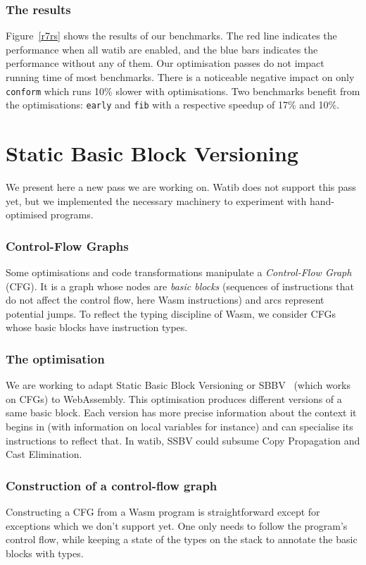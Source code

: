 \documentclass[a4paper,11pt]{article}
\begin{document}
\subsubsection{The results}
Figure~\ref{r7rs} shows the results of our benchmarks. The red line indicates
the performance when all \textsf{watib} are enabled, and the blue bars indicates
the performance without any of them. Our optimisation passes do not impact
running time of most benchmarks. There is a noticeable negative impact on only
\texttt{conform} which runs 10\% slower with optimisations. Two benchmarks
benefit from the optimisations: \texttt{early} and \texttt{fib} with a
respective speedup of 17\% and 10\%.

\section{Static Basic Block Versioning}\label{sbbv}
We present here a new pass we are working on. \textsf{Watib} does not support
this pass yet, but we implemented the necessary machinery to experiment with
hand-optimised programs.
\subsubsection{Control-Flow Graphs}\label{cfg}
Some optimisations and code transformations manipulate a \emph{Control-Flow
Graph} (CFG). It is a graph whose nodes are \emph{basic blocks} (sequences of
instructions that do not affect the control flow, here Wasm instructions) and
arcs represent potential jumps. To reflect the typing discipline of Wasm, we
consider CFGs whose basic blocks have instruction types.

\subsubsection{The optimisation}
We are working to adapt Static Basic Block Versioning or
SBBV~\cite{melanccon2024static} (which works on CFGs) to WebAssembly. This
optimisation produces different versions of a same basic block. Each version has
more precise information about the context it begins in (with information on
local variables for instance) and can specialise its instructions to reflect
that. In \textsf{watib}, SSBV could subsume Copy Propagation and Cast
Elimination.

\subsubsection{Construction of a control-flow graph}
Constructing a CFG from a Wasm program is straightforward except for exceptions
which we don't support yet. One only needs to follow the program's control flow,
while keeping a state of the types on the stack to annotate the basic blocks
with types.
\end{document}
